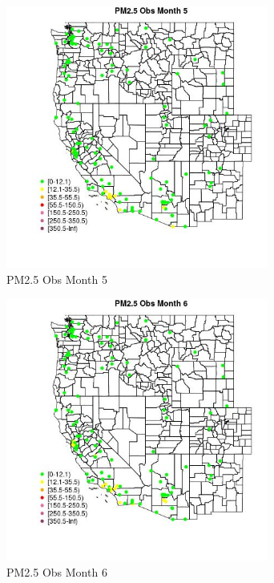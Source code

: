 \begin{figure} 
\centering  
\includegraphics[width=0.77\textwidth]{Code_Outputs/Report_ML_input_PM25_Step4_part_e_de_duplicated_aves_MapObsMo5PM25_Obs.jpg} 
\caption{\label{fig:Report_ML_input_PM25_Step4_part_e_de_duplicated_avesMapObsMo5PM25_Obs}PM2.5 Obs Month 5} 
\end{figure} 
 

\begin{figure} 
\centering  
\includegraphics[width=0.77\textwidth]{Code_Outputs/Report_ML_input_PM25_Step4_part_e_de_duplicated_aves_MapObsMo6PM25_Obs.jpg} 
\caption{\label{fig:Report_ML_input_PM25_Step4_part_e_de_duplicated_avesMapObsMo6PM25_Obs}PM2.5 Obs Month 6} 
\end{figure} 
 

